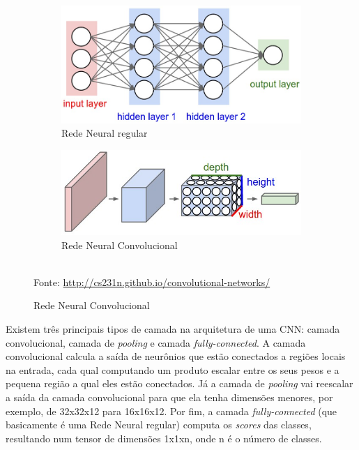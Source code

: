\documentclass{article}
\begin{document}
		\begin{figure}[H]			
			\caption[CNNs x MLP ]
			{MLP x CNN}
			\centering
			\begin{subfigure}[b]{150px}				
				\caption{Rede Neural regular}
				\includegraphics[width=\textwidth]{5.jpeg}
			\end{subfigure}
			\qquad
			\begin{subfigure}[b]{150px}				
				\caption{Rede Neural Convolucional}
				\includegraphics[width=\textwidth]{6.jpeg}
			\end{subfigure}	\\
			{Fonte: \href{http://cs231n.github.io/convolutional-networks/}{http://cs231n.github.io/convolutional-networks/}}	
		\end{figure}
			
		Existem três principais tipos de camada na arquitetura de uma CNN: camada convolucional, camada de \textit{pooling} e camada \textit{fully-connected}. A camada convolucional calcula a saída de neurônios que estão conectados a regiões locais na entrada, cada qual computando um produto escalar entre os seus pesos e a pequena região a qual eles estão conectados. 
		Já a camada de \textit{pooling} vai reescalar a saída da camada convolucional para que ela tenha dimensões menores, por exemplo, de 32x32x12 para 16x16x12. Por fim, a camada \textit{fully-connected} (que basicamente é uma Rede Neural regular) computa os \textit{scores} das classes, resultando num tensor de dimensões 1x1xn, onde n é o número de classes. 
		
\end{document}
